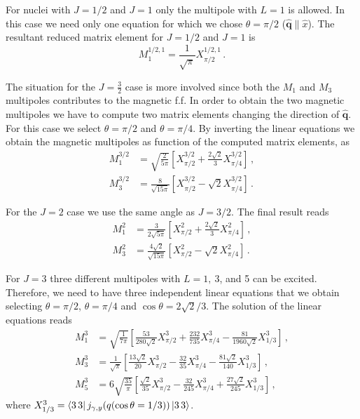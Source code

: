 \documentclass[aps,prc,floatfix,showpacs,twocolumn, preprintnumbers]{revtex4-2}
\newcommand{\beq}{\begin{equation}}
\newcommand{\eeq}{\end{equation}}
\def\beq{\begin{equation}}
\def\eeq{\end{equation}}
\begin{document}
For nuclei with $J=1/2$ and $J=1$ only the multipole with $L=1$ is allowed. In this case we need only one equation for which we chose $\theta=\pi/2$ ($\hat{\bm{q}}\parallel\hat x$).
The resultant reduced matrix element for $J=1/2$ and $J=1$ is 
\beq
  M_1^{1/2,1}=\frac{1}{\sqrt{\pi}}X_{\pi/2}^{1/2,1}\,.
\eeq

The situation for the $J=\frac{3}{2}$ case is more involved since both the $M_1$ and $M_3$
multipoles contributes to the magnetic f.f. In order to obtain the two magnetic multipoles
we have to compute two matrix elements changing the direction of $\hat{\bm{q}}$. For this case we select
$\theta=\pi/2$ and $\theta=\pi/4$.  By inverting
the linear equations we obtain the magnetic multipoles as function of the computed matrix elements, as
\begin{align}
  M_1^{3/2}&=\sqrt{\frac{2}{5\pi}}\left[X^{3/2}_{\pi/2}+\frac{2\sqrt{2}}{3}X^{3/2}_{\pi/4}\right]\,,\\
  M_3^{3/2}&=\frac{8}{\sqrt{15\pi}}\left[X^{3/2}_{\pi/2}-\sqrt{2}X^{3/2}_{\pi/4}\right]\,.
\end{align}

For the $J=2$ case we use the same angle as $J=3/2$. The final result reads
\begin{align}
  M_1^{2}&=\frac{3}{2\sqrt{5\pi}}\left[X^{2}_{\pi/2}+\frac{2\sqrt{2}}{3}X^{2}_{\pi/4}\right]\,,\\
  M_3^{2}&=\frac{4\sqrt{2}}{\sqrt{15\pi}}\left[X^{2}_{\pi/2}-\sqrt{2}X^{2}_{\pi/4}\right]\,.
\end{align}

For $J=3$ three different multipoles with $L=1,~3$, and 5 can be excited. Therefore, we need to have three independent linear equations  that 
we obtain selecting $\theta=\pi/2$, $\theta=\pi/4$ and $\cos \theta=2\sqrt{2}/3$. The solution of the linear equations reads
\begin{align}
  M_1^{3}&=\sqrt{\frac{1}{7\pi}}\left[\frac{53}{280\sqrt{2}}X^3_{\pi/2}+\frac{232}{735}X^3_{\pi/4}-\frac{81}{1960\sqrt{2}}X^3_{1/3}\right]\,,\\
  M_3^{3}&=\frac{1}{\sqrt{\pi}}\left[\frac{13\sqrt{2}}{20}X^3_{\pi/2}-\frac{32}{35}X^3_{\pi/4}-\frac{81\sqrt{2}}{140}X^3_{1/3}\right]\,,\\
    M_5^{3}&=6\sqrt{\frac{35}{\pi}}\left[\frac{\sqrt{2}}{35}X^3_{\pi/2}-\frac{32}{245}X^3_{\pi/4}+\frac{27\sqrt{2}}{245}X^3_{1/3}\right]\,,
\end{align}
where $X^3_{1/3}=\bra{3\,3}{j}_{\gamma,y}(q(\cos\theta=1/3))\ket{3\,3}$.
\end{document}
